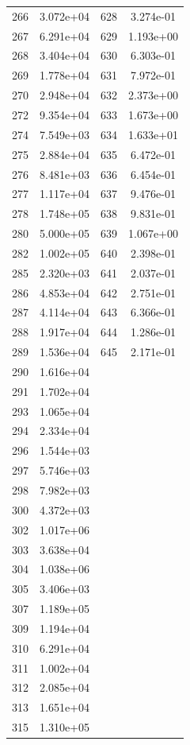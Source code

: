 \documentclass[12pt]{article}
\begin{document}
\begin{longtable}{@{}cccc@{}}
266 & 3.072e+04 & 628 & 3.274e-01 \\
267 & 6.291e+04 & 629 & 1.193e+00 \\
268 & 3.404e+04 & 630 & 6.303e-01 \\
269 & 1.778e+04 & 631 & 7.972e-01 \\
270 & 2.948e+04 & 632 & 2.373e+00 \\
272 & 9.354e+04 & 633 & 1.673e+00 \\
274 & 7.549e+03 & 634 & 1.633e+01 \\
275 & 2.884e+04 & 635 & 6.472e-01 \\
276 & 8.481e+03 & 636 & 6.454e-01 \\
277 & 1.117e+04 & 637 & 9.476e-01 \\
278 & 1.748e+05 & 638 & 9.831e-01 \\
280 & 5.000e+05 & 639 & 1.067e+00 \\
282 & 1.002e+05 & 640 & 2.398e-01 \\
285 & 2.320e+03 & 641 & 2.037e-01 \\
286 & 4.853e+04 & 642 & 2.751e-01 \\
287 & 4.114e+04 & 643 & 6.366e-01 \\
288 & 1.917e+04 & 644 & 1.286e-01 \\
289 & 1.536e+04 & 645 & 2.171e-01 \\
290 & 1.616e+04 &  &  \\
291 & 1.702e+04 &  &  \\
293 & 1.065e+04 &  &  \\
294 & 2.334e+04 &  &  \\
296 & 1.544e+03 &  &  \\
297 & 5.746e+03 &  &  \\
298 & 7.982e+03 &  &  \\
300 & 4.372e+03 &  &  \\
302 & 1.017e+06 &  &  \\
303 & 3.638e+04 &  &  \\
304 & 1.038e+06 &  &  \\
305 & 3.406e+03 &  &  \\
307 & 1.189e+05 &  &  \\
309 & 1.194e+04 &  &  \\
310 & 6.291e+04 &  &  \\
311 & 1.002e+04 &  &  \\
312 & 2.085e+04 &  &  \\
313 & 1.651e+04 &  &  \\
315 & 1.310e+05 &  &  \\

\end{longtable}
\end{document}

